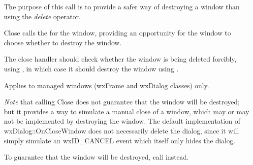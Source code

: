 


\label{wxwindowclose}


The purpose of this call is to provide a safer way of destroying a window than using
the {\it delete} operator.




Close calls the  for the window, providing an opportunity for the window to
choose whether to destroy the window.

The close handler should check whether the window is being deleted forcibly,
using , in which case it should
destroy the window using .

Applies to managed windows (wxFrame and wxDialog classes) only.

{\it Note} that calling Close does not guarantee that the window will be destroyed; but it
provides a way to simulate a manual close of a window, which may or may not be implemented by
destroying the window. The default implementation of wxDialog::OnCloseWindow does not
necessarily delete the dialog, since it will simply simulate an wxID\_CANCEL event which
itself only hides the dialog.

To guarantee that the window will be destroyed, call  instead.


